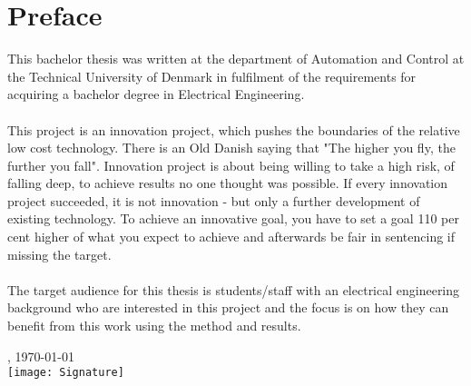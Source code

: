 \chapter{Preface}
This bachelor thesis was written at the department of Automation and Control at the Technical University of Denmark in fulfilment of the requirements for acquiring a bachelor degree in Electrical Engineering.\\
\\
\noindent
This project is an innovation project, which pushes the boundaries of the relative low cost technology. There is an Old Danish saying that "The higher you fly, the further you fall". Innovation project is about being willing to take a high risk, of falling deep, to achieve results no one thought was possible. If every innovation project succeeded, it is not innovation - but only a further development of existing technology. To achieve an innovative goal, you have to set a goal 110 per cent higher of what you expect to achieve and afterwards be fair in sentencing if missing the target.\\
\\
\noindent
The target audience for this thesis is students/staff with an electrical engineering background who are interested in this project and the focus is on how they can benefit from this work using the method and results.    

\vfill

{
\centering
    \thesislocation{}, \today\\[1cm]
    \hspace{3cm}\texttt{[image: Signature]}\\[1cm]
\begin{flushright}
    \thesisauthor{}
\end{flushright}
}